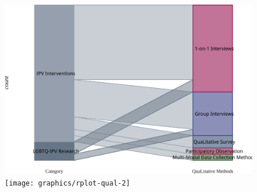 \documentclass[]{tufte-handout}
\begin{document}
\begin{figure}
\includegraphics[width=\linewidth]{graphics/rplot-qual-1} \texttt{[image: graphics/rplot-qual-2]} \end{figure}

\newpage

\end{document}
